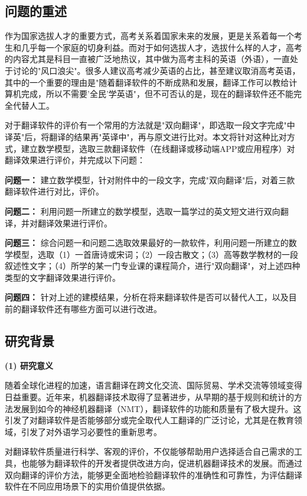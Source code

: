 \documentclass[bwprint]{cumcmthesis}
\begin{document}
\subsection{问题的重述}

作为国家选拔人才的重要方式，高考关系着国家未来的发展，更是关系着每一个考生和几乎每一个家庭的切身利益。而对于如何选拔人才，选拔什么样的人才，高考的内容尤其是科目一直被广泛地热议，其中做为高考主科的英语（外语），一直处于讨论的"风口浪尖"。很多人建议高考减少英语的占比，甚至建议取消高考英语，其中的一个重要的理由是"随着翻译软件的不断成熟和发展，翻译工作可以教给计算机完成，所以不需要'全民'学英语"，但不可否认的是，现在的翻译软件还不能完全代替人工。

对于翻译软件的评价有一个常用的方法就是"双向翻译"，即选取一段文字完成"中译英"后，将翻译的结果再"英译中"，再与原文进行比对。本文将针对这种比对方式，建立数学模型，选取三款翻译软件（在线翻译或移动端APP或应用程序）对翻译效果进行评价，并完成以下问题：

\textbf{问题一：} 建立数学模型，针对附件中的一段文字，完成"双向翻译"后，对着三款翻译软件进行对比，评价。

\textbf{问题二：} 利用问题一所建立的数学模型，选取一篇学过的英文短文进行双向翻译，并对翻译效果进行评价。

\textbf{问题三：} 综合问题一和问题二选取效果最好的一款软件，利用问题一所建立的数学模型，选取（1）一首唐诗或宋词；（2）一段古散文；（3）高等数学教材的一段叙述性文字；（4）所学的某一门专业课的课程简介，进行"双向翻译"，对上述四种类型的文字翻译效果进行评价。

\textbf{问题四：} 针对上述的建模结果，分析在将来翻译软件是否可以替代人工，以及目前的翻译软件还有哪些方面可以进行改进。

\subsection{研究背景}

\textbf{(1) 研究意义}

随着全球化进程的加速，语言翻译在跨文化交流、国际贸易、学术交流等领域变得日益重要。近年来，机器翻译技术取得了显著进步，从早期的基于规则和统计的方法发展到如今的神经机器翻译（NMT），翻译软件的功能和质量有了极大提升。这引发了对翻译软件是否能够部分或完全取代人工翻译的广泛讨论，尤其是在教育领域，引发了对外语学习必要性的重新思考。

对翻译软件质量进行科学、客观的评价，不仅能够帮助用户选择适合自己需求的工具，也能够为翻译软件的开发者提供改进方向，促进机器翻译技术的发展。而通过双向翻译的评价方法，能够更全面地检验翻译软件的准确性和可靠性，为评估翻译软件在不同应用场景下的实用价值提供依据。
\end{document}
